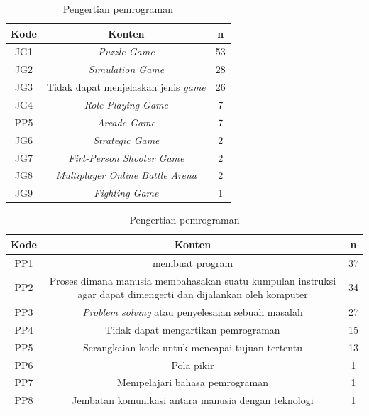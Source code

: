 \begin{table}
	\centering
	\caption{Pengertian pemrograman}
	\label{tab:tab1}
	\begin{tabular}{| c | c | c |}
		\hline
		Kode & Konten & n \\
		\hline
		JG1 & \multicolumn{1}{p{10cm}|}{\textit{Puzzle Game}} & 53 \\ \hline
		JG2 & \multicolumn{1}{p{10cm}|}{\textit{Simulation Game}} & 28 \\ \hline
		JG3 & \multicolumn{1}{p{10cm}|}{Tidak dapat menjelaskan jenis \textit{game}} & 26 \\
		\hline
		JG4 & \multicolumn{1}{p{10cm}|}{\textit{Role-Playing Game}} & 7 \\ \hline
		PP5 & \multicolumn{1}{p{10cm}|}{\textit{Arcade Game}} & 7 \\ \hline
		JG6 & \multicolumn{1}{p{10cm}|}{\textit{Strategic Game}} & 2 \\ \hline
		JG7 & \multicolumn{1}{p{10cm}|}{\textit{Firt-Person Shooter Game}} & 2 \\ \hline
		JG8 & \multicolumn{1}{p{10cm}|}{\textit{Multiplayer Online Battle Arena}} & 2 \\ \hline
		JG9 & \multicolumn{1}{p{10cm}|}{\textit{Fighting Game}} & 1 \\ \hline
	\end{tabular}
\end{table}

\begin{table}
	\centering
	\caption{Pengertian pemrograman}
	\label{tab:tab1}
	\begin{tabular}{| c | c | c |}
		\hline
		Kode & Konten & n \\
		\hline
		PP1 & \multicolumn{1}{p{10cm}|}{membuat program} & 37 \\ \hline
		PP2 & \multicolumn{1}{p{10cm}|}{Proses dimana manusia membahasakan suatu kumpulan instruksi agar dapat dimengerti dan dijalankan oleh komputer} & 34 \\ \hline
		PP3 & \multicolumn{1}{p{10cm}|}{\textit{Problem solving} atau penyelesaian sebuah masalah} & 27 \\
		\hline
		PP4 & \multicolumn{1}{p{10cm}|}{Tidak dapat mengartikan pemrograman} & 15 \\ \hline
		PP5 & \multicolumn{1}{p{10cm}|}{Serangkaian kode untuk mencapai tujuan tertentu} & 13 \\ \hline
		PP6 & \multicolumn{1}{p{10cm}|}{Pola pikir} & 1 \\ \hline
		PP7 & \multicolumn{1}{p{10cm}|}{Mempelajari bahasa pemrograman} & 1 \\ \hline
		PP8 & \multicolumn{1}{p{10cm}|}{Jembatan komunikasi antara manusia dengan teknologi} & 1 \\ \hline
	\end{tabular}
\end{table}


